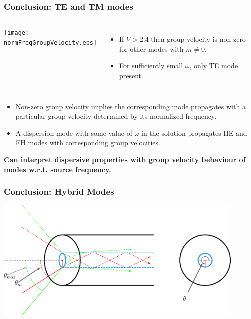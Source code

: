 \documentclass{beamer}
\begin{document}
\begin{frame}[fragile]
\frametitle{\textbf{Conclusion:} TE and TM modes}
\begin{columns}
\texttt{[image: normFreqGroupVelocity.eps]}
\begin{itemize}
\item If $V>2.4$ then group velocity is non-zero for other modes with $m\neq 0$.
\item For sufficiently small $\omega$, only TE mode present.
\end{itemize}
\end{columns}
\begin{itemize}
\item Non-zero group velocity implies the corresponding mode propagates with a particular group velocity determined by its normalized frequency.
\item A dispersion mode with some value of $\omega$ in the solution propagates HE and EH modes with corresponding group velocities.
\end{itemize}
\end{frame}


\begin{frame}
\textbf{Can interpret dispersive properties with group velocity behaviour of modes w.r.t. source frequency.}
\frametitle{\textbf{Conclusion:} Hybrid Modes}
\includegraphics[width=12cm]{conclusionDiagram.eps}
\end{frame}
\end{document}
